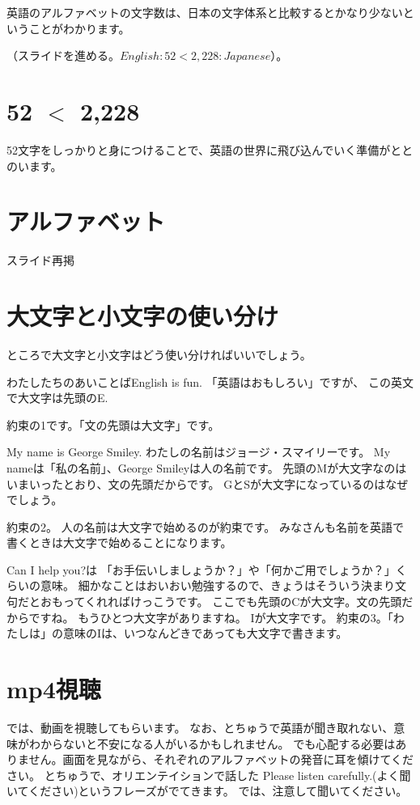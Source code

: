 \documentclass[book,jafontscale=0.9247]{jlreq}
\begin{document}
英語のアルファベットの文字数は、日本の文字体系と比較するとかなり少ないということがわかります。


（スライドを進める。$English\colon{}52<2,228\colon{}Japanese$）。

\section{52 $<$ 2,228}
52文字をしっかりと身につけることで、英語の世界に飛び込んでいく準備がととのいます。

\section{アルファベット}

スライド再掲

\section{大文字と小文字の使い分け}

ところで大文字と小文字はどう使い分ければいいでしょう。

わたしたちのあいことばEnglish is fun.
「英語はおもしろい」ですが、
この英文で大文字は先頭のE.

約束の1です。「文の先頭は大文字」です。

My name is George Smiley.
わたしの名前はジョージ・スマイリーです。
My nameは「私の名前」、George Smileyは人の名前です。
先頭のMが大文字なのはいまいったとおり、文の先頭だからです。
GとSが大文字になっているのはなぜでしょう。

約束の2。
人の名前は大文字で始めるのが約束です。
みなさんも名前を英語で書くときは大文字で始めることになります。

Can I help you?は
「お手伝いしましょうか？」や「何かご用でしょうか？」くらいの意味。
細かなことはおいおい勉強するので、きょうはそういう決まり文句だとおもってくれればけっこうです。
ここでも先頭のCが大文字。文の先頭だからですね。
もうひとつ大文字がありますね。
Iが大文字です。
約束の3。「わたしは」の意味のIは、いつなんどきであっても大文字で書きます。




\section{mp4視聴}
では、動画を視聴してもらいます。
なお、とちゅうで英語が聞き取れない、意味がわからないと不安になる人がいるかもしれません。
でも心配する必要はありません。画面を見ながら、それぞれのアルファベットの発音に耳を傾けてください。
とちゅうで、オリエンテイションで話した
Please listen carefully.(よく聞いてください)というフレーズがでてきます。
では、注意して聞いてください。
\end{document}
